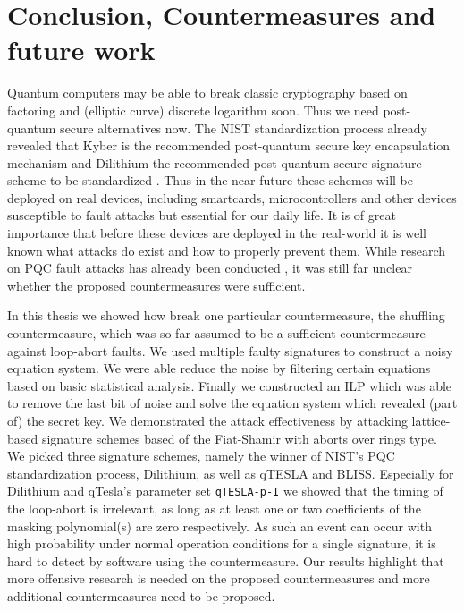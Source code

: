 %




\chapter{Conclusion, Countermeasures and future work}
Quantum computers may be able to break classic cryptography based on factoring and (elliptic curve) discrete logarithm soon. Thus we need post-quantum secure alternatives now. The NIST standardization process already revealed that Kyber is the recommended post-quantum secure key encapsulation mechanism and Dilithium the recommended post-quantum secure signature scheme to be standardized \cite{niststatus}.
Thus in the near future these schemes will be deployed on real devices, including  smartcards, microcontrollers and other devices susceptible to fault attacks but essential for our daily life. It is of great importance that before these devices are deployed in the real-world it is well known what attacks do exist and how to properly prevent them. While research on PQC fault attacks  has already been conducted \cite{espitau,Groot_Bruinderink_Pessl_2018,sensitivity,faultccm}%
, it was still far unclear whether the proposed countermeasures were sufficient.

In this thesis we showed how break one particular countermeasure, the shuffling countermeasure, which was so far assumed to be a sufficient countermeasure against loop-abort faults. 
We used multiple faulty signatures to construct a noisy equation system. We were able reduce the noise by filtering certain equations based on basic statistical analysis. Finally we constructed an ILP which was able to remove the last bit of noise and solve the equation system which revealed (part of) the secret key.
We demonstrated the attack effectiveness by attacking lattice-based signature schemes based of the Fiat-Shamir with aborts over rings type. We picked three signature schemes, namely the winner of NIST's PQC standardization process, Dilithium, as well as qTESLA and BLISS. Especially for Dilithium and qTesla's parameter set \texttt{qTESLA-p-I} we showed that the timing of the loop-abort is irrelevant, as long as at least one or two coefficients of the masking polynomial(s) are zero respectively. As such an event can occur with high probability under normal operation conditions for a single signature, it is hard to detect by software using the  countermeasure. Our results highlight that more offensive research is needed on the proposed countermeasures and more additional countermeasures need to be proposed.
